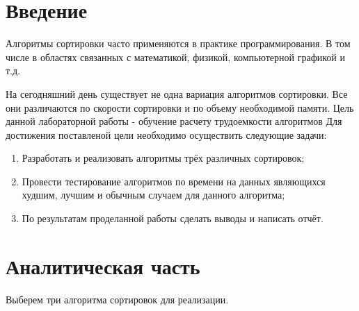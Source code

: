 \documentclass[12pt]{report}
\begin{document}


\renewcommand{\contentsname}{Содержание}
\tableofcontents

\newpage
\chapter*{Введение}
Алгоритмы сортировки часто применяются в практике программирования. В том числе в областях связанных с математикой, физикой, компьютерной графикой и т.д.

На сегодняшний день существует не одна вариация алгоритмов сортировки. Все они различаются по скорости сортировки и по объему необходимой памяти. 
Цель данной лабораторной работы - обучение расчету трудоемкости алгоритмов
Для достижения поставленой цели необходимо осуществить следующие задачи:
\begin{enumerate}
\item Разработать и реализовать алгоритмы трёх различных сортировок;
\item Провести тестирование алгоритмов по времени на данных являющихся худшим, лучшим и обычным случаем для данного алгоритма;
\item По результатам проделанной работы сделать выводы и написать отчёт.
\end{enumerate}
\chapter{Аналитическая часть}
Выберем три алгоритма сортировок для реализации.
\end{document}
